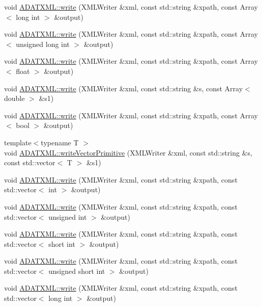 \begin{DoxyCompactItemize}
\item 
void \mbox{\hyperlink{group__io_gaa86792c3bbc86036087623eee8f75f15}{A\+D\+A\+T\+X\+M\+L\+::write}} (X\+M\+L\+Writer \&xml, const std\+::string \&xpath, const Array$<$ long int $>$ \&output)
\item 
void \mbox{\hyperlink{group__io_gaa89a8fb5de3a6ff255c50428b84a232c}{A\+D\+A\+T\+X\+M\+L\+::write}} (X\+M\+L\+Writer \&xml, const std\+::string \&xpath, const Array$<$ unsigned long int $>$ \&output)
\item 
void \mbox{\hyperlink{group__io_ga37bab6df89540c0999683cb373ad2d3d}{A\+D\+A\+T\+X\+M\+L\+::write}} (X\+M\+L\+Writer \&xml, const std\+::string \&xpath, const Array$<$ float $>$ \&output)
\item 
void \mbox{\hyperlink{group__io_ga82a292d577216b66e12c9876c7fe7a10}{A\+D\+A\+T\+X\+M\+L\+::write}} (X\+M\+L\+Writer \&xml, const std\+::string \&s, const Array$<$ double $>$ \&s1)
\item 
void \mbox{\hyperlink{group__io_ga9a93f3084bfa9501e5fb5da53925c25d}{A\+D\+A\+T\+X\+M\+L\+::write}} (X\+M\+L\+Writer \&xml, const std\+::string \&xpath, const Array$<$ bool $>$ \&output)
\item 
{\footnotesize template$<$typename T $>$ }\\void \mbox{\hyperlink{namespaceADATXML_ac69d6dbd4a4a3ca366df448dfc85c9d2}{A\+D\+A\+T\+X\+M\+L\+::write\+Vector\+Primitive}} (X\+M\+L\+Writer \&xml, const std\+::string \&s, const std\+::vector$<$ T $>$ \&s1)
\item 
void \mbox{\hyperlink{group__io_ga5f73c76144fce7c12dd53d0f785b2d05}{A\+D\+A\+T\+X\+M\+L\+::write}} (X\+M\+L\+Writer \&xml, const std\+::string \&xpath, const std\+::vector$<$ int $>$ \&output)
\item 
void \mbox{\hyperlink{group__io_ga763106f559ef609d54f89243e5965af4}{A\+D\+A\+T\+X\+M\+L\+::write}} (X\+M\+L\+Writer \&xml, const std\+::string \&xpath, const std\+::vector$<$ unsigned int $>$ \&output)
\item 
void \mbox{\hyperlink{group__io_ga9085d80500322f8f56b37df7c27cd61a}{A\+D\+A\+T\+X\+M\+L\+::write}} (X\+M\+L\+Writer \&xml, const std\+::string \&xpath, const std\+::vector$<$ short int $>$ \&output)
\item 
void \mbox{\hyperlink{group__io_gad9f57f8c23abf2a400ef501bb816e173}{A\+D\+A\+T\+X\+M\+L\+::write}} (X\+M\+L\+Writer \&xml, const std\+::string \&xpath, const std\+::vector$<$ unsigned short int $>$ \&output)
\item 
void \mbox{\hyperlink{group__io_ga402db05a61329b7bfeb8e92021f669c6}{A\+D\+A\+T\+X\+M\+L\+::write}} (X\+M\+L\+Writer \&xml, const std\+::string \&xpath, const std\+::vector$<$ long int $>$ \&output)

\end{DoxyCompactItemize}
